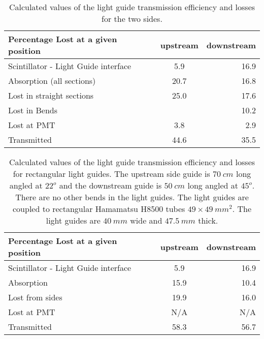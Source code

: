\begin{table}[htbp]
\begin{center}
\begin{tabular}{|l|c|r|} \hline
Percentage Lost at a given position	&upstream   	& downstream         \\ \hline
Scintillator - Light Guide interface	& 5.9      & 16.9              \\ \hline 
Absorption (all sections) & 20.7	& 16.8 		\\ \hline
Lost in straight sections  	& 25.0 		& 17.6 		\\ \hline
Lost in Bends  	& 		& 10.2		\\ \hline
Lost at PMT  	& 3.8 		& 2.9 		\\ \hline \hline 
Transmitted  	& 44.6 		& 35.5 		\\ \hline
\end{tabular}
\caption{Calculated values of the light guide
 transmission efficiency and losses for the two sides.\label{mud1}}
\end{center}
\end{table}


\begin{table}[htbp]
\begin{center}
\begin{tabular}{|l|c|r|} \hline
Percentage Lost at a given position	&upstream   	& downstream         \\ \hline
Scintillator - Light Guide interface	& 5.9      & 16.9              \\ \hline 
Absorption  & 15.9	& 10.4 		\\ \hline
Lost from sides  	& 19.9 		& 16.0 		\\ \hline
Lost at PMT  	& N/A 		& N/A 		\\ \hline \hline 
Transmitted  	& 58.3 		& 56.7 		\\ \hline
\end{tabular}
\end{center}\caption{Calculated values of the light guide transmission efficiency and losses for rectangular light guides.
 The upstream side guide is $70~cm$ long angled at $22^o$ and the downstream guide is $50~cm$ long angled at $45^o$. 
There are no other bends in the light guides.
 The light guides are coupled to rectangular Hamamatsu H8500  tubes $49\times 49~mm^2$. The light guides are $40~mm$ wide and $47.5~mm$ 
thick.\label{mud2}}
\end{table}

